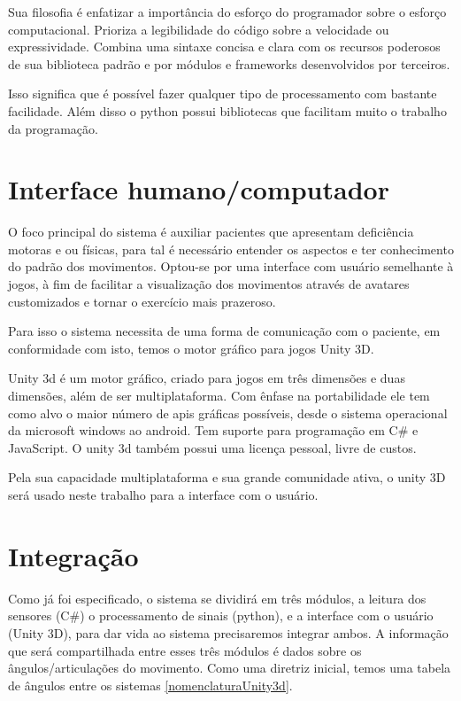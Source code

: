 Sua filosofia é enfatizar a importância do esforço do programador sobre o esforço
 computacional. Prioriza a legibilidade do código sobre a velocidade ou 
expressividade. Combina uma sintaxe concisa e clara com os recursos poderosos de
 sua biblioteca padrão e por módulos e frameworks desenvolvidos por terceiros.

Isso significa que é possível fazer qualquer tipo de processamento com bastante
 facilidade. Além disso o python possui bibliotecas que facilitam muito o trabalho da programação.

\section{Interface humano/computador}
\label{Sec:Interface humano/computador}
  O foco principal do sistema é auxiliar pacientes que apresentam deficiência 
motoras e ou físicas, para tal é necessário entender os aspectos e
ter conhecimento do padrão dos movimentos. 
Optou-se por uma interface com usuário semelhante à jogos, à fim de facilitar a visualização dos movimentos através de avatares customizados e tornar o exercício mais prazeroso.


Para isso o sistema necessita
de uma forma de comunicação com o paciente, em conformidade com isto, 
temos o motor gráfico para jogos Unity 3D.
  
  Unity 3d é um motor gráfico, criado para jogos em três dimensões e duas dimensões, além de ser
multiplataforma. Com ênfase na portabilidade ele tem como alvo o maior número
de apis gráficas possíveis, desde o sistema operacional da microsoft windows 
ao android.  Tem suporte para programação em C\# e JavaScript. O unity 3d também
 possui uma licença pessoal, livre de custos.

  Pela sua capacidade multiplataforma e sua grande comunidade ativa, o unity 3D
será usado neste trabalho para a interface com o usuário.
  
\section{Integração}
\label{Sec:Integração}

  Como já foi especificado, o sistema se dividirá em três módulos, a leitura dos sensores (C\#) o processamento
de sinais (python), e a interface com o usuário (Unity 3D), para dar vida ao sistema
precisaremos integrar ambos. A informação que será compartilhada entre esses três
módulos é dados sobre os ângulos/articulações do movimento. Como uma diretriz inicial,
 temos uma tabela de ângulos entre os sistemas \ref{nomenclaturaUnity3d}.


